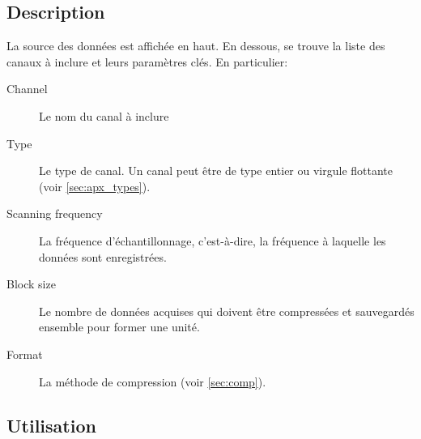 \documentclass[a4paper,12pt,BCOR6mm,bibtotoc,idxtotoc]{scrbook}
\begin{document}
\subsection{Description}

La source des donn\'ees est affich\'ee en haut. En dessous, se trouve la liste des canaux
\`a inclure et leurs param\`etres cl\'es. En particulier:

\begin{description}

\item[Channel]
  Le nom du canal \`a inclure

\item[Type]
  Le type de canal. Un canal peut \^etre de type entier ou virgule
  flottante (voir \autoref{sec:apx_types}).

\item[Scanning frequency]
  La fr\'equence d'\'echantillonnage, c'est-\`a-dire, la fr\'equence
  \`a laquelle les donn\'ees sont enregistr\'ees.

\item[Block size]
  Le nombre de donn\'ees acquises qui doivent \^etre compress\'ees et sauvegard\'es
  ensemble pour former une unit\'e.

\item[Format]
  La m\'ethode de compression (voir \autoref{sec:comp}).

\end{description}


\subsection{Utilisation}
\end{document}
